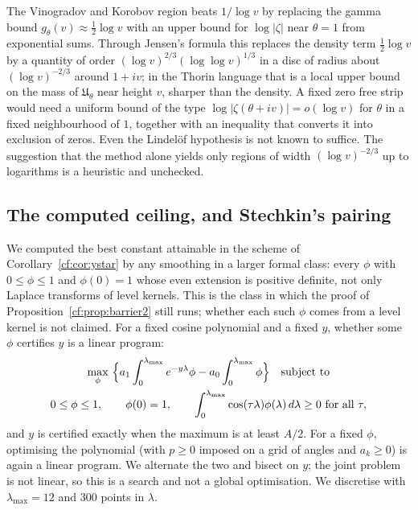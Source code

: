 \begin{remark}
The Vinogradov and Korobov region beats $1/\log v$ by replacing the gamma bound $g_\theta(v)\approx\frac12\log v$ with an upper bound for $\log\lvert\zeta\rvert$ near $\theta=1$ from exponential sums. Through Jensen's formula this replaces the density term $\frac12\log v$ by a quantity of order $(\log v)^{2/3}(\log\log v)^{1/3}$ in a disc of radius about $(\log v)^{-2/3}$ around $1+iv$; in the Thorin language that is a local upper bound on the mass of $\mathfrak U_\theta$ near height $v$, sharper than the density. A fixed zero free strip would need a uniform bound of the type $\log\lvert\zeta(\theta+iv)\rvert=o(\log v)$ for $\theta$ in a fixed neighbourhood of $1$, together with an inequality that converts it into exclusion of zeros. Even the Lindel\"of hypothesis is not known to suffice. The suggestion that the method alone yields only regions of width $(\log v)^{-2/3}$ up to logarithms is a heuristic and unchecked.
\end{remark}

\subsection{The computed ceiling, and Stechkin's pairing}

We computed the best constant attainable in the scheme of Corollary~\ref{cf:cor:ystar} by any smoothing in a larger formal class: every $\phi$ with $0\le\phi\le1$ and $\phi(0)=1$ whose even extension is positive definite, not only Laplace transforms of level kernels. This is the class in which the proof of Proposition~\ref{cf:prop:barrier2} still runs; whether each such $\phi$ comes from a level kernel is not claimed. For a fixed cosine polynomial and a fixed $y$, whether some $\phi$ certifies $y$ is a linear program:
\begin{gather*}
\max_\phi\ \Bigl\{a_1\int_0^{\lambda_{\max}}e^{-y\lambda}\phi-a_0\int_0^{\lambda_{\max}}\phi\Bigr\}\quad\text{subject to}\\
0\le\phi\le1,\qquad\phi(0)=1,\qquad\int_0^{\lambda_{\max}}\cos(\tau\lambda)\phi(\lambda)\,d\lambda\ge0\ \text{for all }\tau,
\end{gather*}
and $y$ is certified exactly when the maximum is at least $A/2$. For a fixed $\phi$, optimising the polynomial (with $p\ge0$ imposed on a grid of angles and $a_k\ge0$) is again a linear program. We alternate the two and bisect on $y$; the joint problem is not linear, so this is a search and not a global optimisation. We discretise with $\lambda_{\max}=12$ and $300$ points in $\lambda$.

